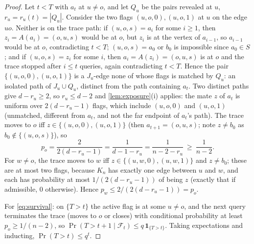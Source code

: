 \documentclass[11pt,a4paper]{article}
\theoremstyle{plain}
\theoremstyle{definition}
\theoremstyle{remark}
\newcommand{\cF}{\mathcal F}
\newcommand{\Ind}{\mathbf 1}
\begin{document}
\label{pf:escape}
\lemescape*
\begin{proof}
Let $t<T$ with $a_t$ at $u\ne o$, and let $Q_u$ be the pairs revealed at $u$, $r_u=r_u(t)=|Q_u|$. Consider the two flags $(u,o,0),(u,o,1)$ at $u$ on the edge $uo$. Neither is on the trace path: if $(u,o,s)=a_i$ for some $i\ge1$, then $z_i=A(a_i)=(o,u,s)$ would be at $o$, but $z_i$ is at the vertex of $a_{i-1}$, so $a_{i-1}$ would be at $o$, contradicting $t<T$; $(u,o,s)=a_0$ or $b_0$ is impossible since $a_0\in S$; and if $(u,o,s)=z_i$ for some $i$, then $a_i=A(z_i)=(o,u,s)$ is at $o$ and the trace stopped after $i\le t$ queries, again contradicting $t<T$. Hence the pair $\{(u,o,0),(u,o,1)\}$ is a $J_u$-edge none of whose flags is matched by $Q_u$: an isolated path of $J_u\cup Q_u$, distinct from the path containing $a_t$. Two distinct paths give $d-r_u\ge2$, so $r_u\le d-2$ and \cref{lem:exposure}(i) applies: the mate $z$ of $a_t$ is uniform over $2(d-r_u-1)$ flags, which include $(u,o,0)$ and $(u,o,1)$ (unmatched, different from $a_t$, and not the far endpoint of $a_t$'s path). The trace moves to $o$ iff $z\in\{(u,o,0),(u,o,1)\}$ (then $a_{t+1}=(o,u,s)$; note $z\ne b_0$ as $b_0\notin\{(u,o,s)\}$), so
\[
p_o=\frac{2}{2(d-r_u-1)}=\frac1{d-1-r_u}=\frac1{n-2-r_u}\ \ge\ \frac1{n-2}.
\]
For $w\ne o$, the trace moves to $w$ iff $z\in\{(u,w,0),(u,w,1)\}$ and $z\ne b_0$; these are at most two flags, because $K_n$ has exactly one edge between $u$ and $w$, and each has probability at most $1/(2(d-r_u-1))$ of being $z$ (exactly that if admissible, $0$ otherwise). Hence $p_w\le2/(2(d-r_u-1))=p_o$.

For \eqref{eq:survival}: on $\{T>t\}$ the active flag is at some $u\ne o$, and the next query terminates the trace (moves to $o$ or closes) with conditional probability at least $p_o\ge1/(n-2)$, so $\Pr(T>t+1\mid\cF_t)\le q\,\Ind_{\{T>t\}}$. Taking expectations and inducting, $\Pr(T>t)\le q^t$.
\end{proof}
\end{document}
